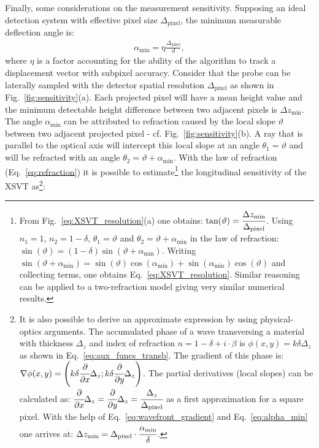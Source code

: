 \begin{refsection}
Finally, some considerations on the measurement sensitivity. Supposing an ideal detection system with effective pixel size $\Delta_\text{pixel}$, the minimum measurable deflection angle is:
\begin{align}\label{eq:alpha_min}
    \alpha_\text{min}=\eta\frac{\Delta_\text{pixel}}{d},
\end{align}
where $\eta$ is a factor accounting for the ability of the algorithm to track a displacement vector with subpixel accuracy. Consider that the probe can be laterally sampled with the detector spatial resolution $\Delta_\text{pixel}$ as shown in Fig.~\ref{fig:sensitivity}(a). Each projected pixel will have a mean height value and the minimum detectable height difference between two adjacent pixels is $\Delta{z_{\text{min}}}$. The angle $\alpha_\text{min}$ can be attributed to refraction caused by the local slope $\vartheta$ between two adjacent projected pixel - cf. Fig.~\ref{fig:sensitivity}(b). A ray that is parallel to the optical axis will intercept this local slope at an angle $\theta_1=\vartheta$ and will be refracted with an angle $\theta_2=\vartheta+\alpha_\text{min}$. With the law of refraction (Eq.~\ref{eq:refraction}) it is possible to estimate\footnote{From Fig.~\ref{eq:XSVT_resolution}(a) one obtains: $\tan(\vartheta)=\cfrac{\Delta{z_{\text{min}}}}{\Delta_\text{pixel}}$. Using $n_1=1$, $n_2=1-\delta$, $\theta_1=\vartheta$ and  $\theta_2=\vartheta+\alpha_\text{min}$ in the law of refraction: $\sin(\vartheta)=(1-\delta)\sin(\vartheta+\alpha_\text{min})$. Writing $\sin(\vartheta+\alpha_\text{min})=\sin(\vartheta)\cos(\alpha_\text{min})+\sin(\alpha_\text{min})\cos(\vartheta)$ and collecting terms, one obtains Eq.~\ref{eq:XSVT_resolution}. Similar reasoning can be applied to a two-refraction model giving very similar numerical results.} the longitudinal sensitivity of the XSVT as\footnote{It is also possible to derive an approximate expression by using physical-optics arguments. The accumulated phase of a wave transversing a material with thickness $\Delta_z$ and index of refraction $n=1-\delta+i\cdot\beta$ is $\phi(x,y)=k\delta\Delta_z$ as shown in Eq.~\ref{eq:aux_funcs_transb}. The gradient of this phase is: $\nabla \phi(x,y)=\Bigg(k\delta\cfrac{\partial}{\partial x}\Delta_z; k\delta\cfrac{\partial}{\partial y}\Delta_z\Bigg)$. The partial derivatives (local slopes) can be calculated as: $\cfrac{\partial}{\partial x}\Delta_z = \cfrac{\partial}{\partial y}\Delta_z = \cfrac{\Delta_z}{ \Delta_\text{pixel}}$ as a first approximation for a square pixel. With the help of Eq.~\ref{eq:wavefront_gradient} and Eq.~\ref{eq:alpha_min} one arrives at: $\Delta{z_{\text{min}}}=\Delta_\text{pixel}\cdot\cfrac{\alpha_\text{min}}{\delta}$.}: 

\end{refsection}
